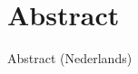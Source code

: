 %
\chapter*{Abstract}
\label{sec:abstract}
\vspace*{-10mm}


\vspace*{20mm}

{Abstract (Nederlands)}\label{sec:abstract-diff} \\
